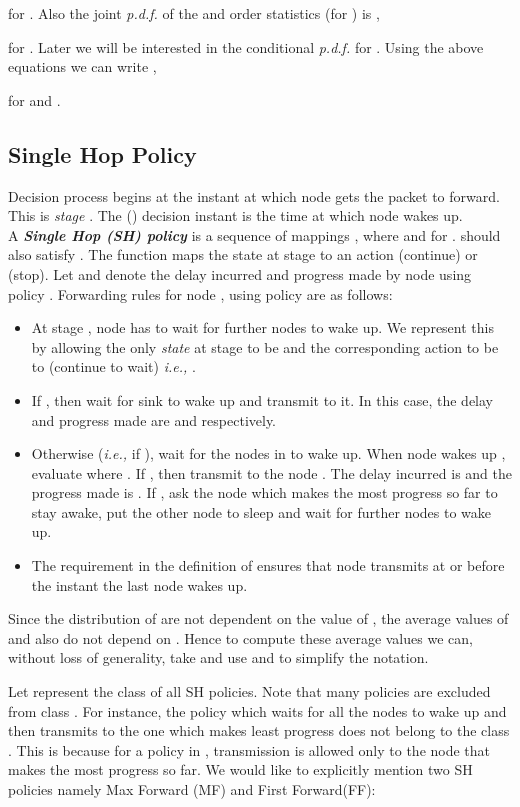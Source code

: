 \documentclass[onecolumn]{IEEEtran}
\begin{document}
for .  Also the joint \emph{p.d.f.} of the  and 
order statistics (for ) is \cite[Chapter 2]{orderstatistics},

for . Later we will be interested in  the  conditional \emph{p.d.f.}   for . Using the above equations we can write ,

for  and .

\subsection{Single Hop Policy}\label{policy_sec}
Decision process begins at the instant  at which node 
gets the packet to forward. This is \emph{stage} .  The 
() decision instant is the time at which node  wakes up.\\
A \emph{\textbf{Single Hop (SH) policy }} is a sequence of
mappings , where
 and for 
.  should
also satisfy . The function 
maps the state at stage  to an action  (continue) or  (stop).  Let  and
 denote the delay incurred and progress made by node 
using policy .  Forwarding rules for node , using policy 
are as follows:
\begin{itemize}
\item At stage , node  has to wait for further nodes to wake up.
  We represent this by allowing the only \emph{state} at stage  to
  be  and the corresponding action to be to 
  (continue to wait) \emph{i.e.,} .
\item If , then wait for sink to wake up and transmit to
  it.  In this case, the delay and progress made are
   and  respectively.
\item Otherwise (\emph{i.e.,} if ), wait for the nodes in
   to wake up. When node  wakes up , evaluate  where . If , then transmit to the node
  . The delay incurred is
   and the progress made is . If
  , ask the node which makes the most progress so far to stay
  awake, put the other node to sleep and wait for further nodes to
  wake up.
\item The requirement  in the definition of
   ensures that node  transmits at or before the instant the
  last node wakes up.
\end{itemize}

Since the distribution of  are not
dependent on the value of , the average values of  and
 also do not depend on . Hence to compute these average
values we can, without loss of generality, take  and use
 and  to simplify the notation.

Let 
 represent the class of all SH policies.
Note that many policies are excluded from class .
  For instance, the policy which waits for all the
  nodes to wake up and then transmits to the one which makes least
  progress does not
  belong to the class . This is because for a policy in , transmission
  is allowed only to the  node that makes the most progress so far.
 We would like to explicitly mention two SH policies namely Max Forward (MF) and First Forward(FF):
\end{document}
